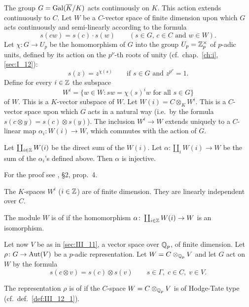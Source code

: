 The group $G = \operatorname{Gal}(\overline{K}/K)$ acts continuously on $K$. This action extends
continuously to $C$. Let $W$ be a $C$-vector space of finite dimension upon
which $G$ acts continuously and semi-linearly according to the formula
\[
	s(cw) = s(c) \cdot s(w) \qquad
	(s \in G, \, c \in C \text{ and } w \in W).
\]
Let $\chi\colon G \to U_p$ be the homomorphism of $G$ into the group $U_p =
\mathbb{Z}_p^\times$ of $p$-adic units, defined by its action on the $p^\nu$-th roots
of unity (cf.\ chap.~\ref{ch:i}, \ref{sec:I_12}):
\dpage
\[
	s(z) = z^{\chi(s)} \qquad \text{if } s \in G \text{ and } z^{p^\nu} = 1.
\]
Define for every $i \in \mathbb{Z}$ the subspace
\[
	W^i = \{ w \in W : sw = \chi(s)^i w \text{ for all } s\in G \}
\]
of $W$. This is a $K$-vector subspace of $W$. Let $W(i) = C \otimes_K W^i$.
This is a $C$-vector space upon which $G$ acts in a natural way (i.e.\ by the
formula $s(c \otimes y) = s(c) \otimes s(y)$). The inclusion $W^i \to W$
extends uniquely to a $C$-linear map $\alpha_i\colon W(i) \to W$, which
commutes with the action of $G$.

\begin{prop}[Tate]
	Let $\coprod_{i\in \mathbb{Z}} W(i)$ be the direct sum of the $W(i)$. Let
	$\alpha\colon \coprod_i W(i) \to W$ be the sum of the $\alpha_i$'s
	defined above. Then $\alpha$ is injective.
\end{prop}
For the proof see \cite{27}, \S 2, prop.~4.
\begin{corp}
	The $K$-spaces $W^i$ ($i \in \mathbb{Z}$) are of finite dimension.
	They are linearly independent over $C$.
\end{corp}

\begin{mydef}\label{def:III_12_1}
	The module $W$ is of %
	if the homomorphism $\alpha\colon \coprod_{i\in\mathbb{Z}} W(i) \to W$ is an
	isomorphism.
\end{mydef}

Let now $V$ be as in \ref{sec:III_11}, a vector space over $\mathbb{Q}_p$, of finite
dimension. Let $\rho\colon G \to \operatorname{Aut}(V)$ be a $p$-adic representation. Let $W
= C \otimes_{\mathbb{Q}_p} V$ and let $G$ act on $W$ by the formula
\dpage
\[
	s(c\otimes v) = s(c) \otimes s(v) \qquad
	s\in \Gamma, \; c\in C, \; v\in V.
\]
\begin{mydef}
	The representation $\rho$ is of %
	 if the $C$-space $W = C \otimes_{\mathbb{Q}_p} V$ is of
	Hodge-Tate type (cf.\ def.~\ref{def:III_12_1}).
\end{mydef}

